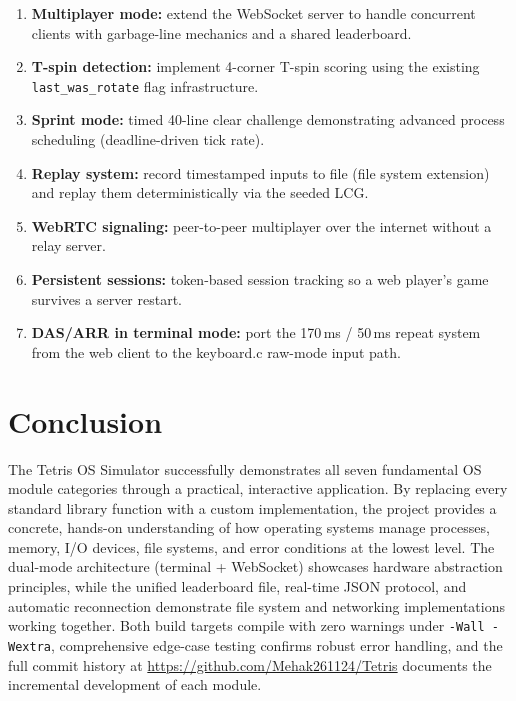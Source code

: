 \documentclass[conference]{IEEEtran}
\begin{document}
\begin{enumerate}
  \item \textbf{Multiplayer mode:} extend the WebSocket server to handle concurrent clients with garbage-line mechanics and a shared leaderboard.
  \item \textbf{T-spin detection:} implement 4-corner T-spin scoring using the existing \texttt{last\_was\_rotate} flag infrastructure.
  \item \textbf{Sprint mode:} timed 40-line clear challenge demonstrating advanced process scheduling (deadline-driven tick rate).
  \item \textbf{Replay system:} record timestamped inputs to file (file system extension) and replay them deterministically via the seeded LCG.
  \item \textbf{WebRTC signaling:} peer-to-peer multiplayer over the internet without a relay server.
  \item \textbf{Persistent sessions:} token-based session tracking so a web player's game survives a server restart.
  \item \textbf{DAS/ARR in terminal mode:} port the 170\,ms / 50\,ms repeat system from the web client to the keyboard.c raw-mode input path.
\end{enumerate}

\section{Conclusion}

The Tetris OS Simulator successfully demonstrates all seven fundamental OS module categories through a practical, interactive application. By replacing every standard library function with a custom implementation, the project provides a concrete, hands-on understanding of how operating systems manage processes, memory, I/O devices, file systems, and error conditions at the lowest level. The dual-mode architecture (terminal + WebSocket) showcases hardware abstraction principles, while the unified leaderboard file, real-time JSON protocol, and automatic reconnection demonstrate file system and networking implementations working together. Both build targets compile with zero warnings under \texttt{-Wall -Wextra}, comprehensive edge-case testing confirms robust error handling, and the full commit history at \url{https://github.com/Mehak261124/Tetris} documents the incremental development of each module.
\end{document}
